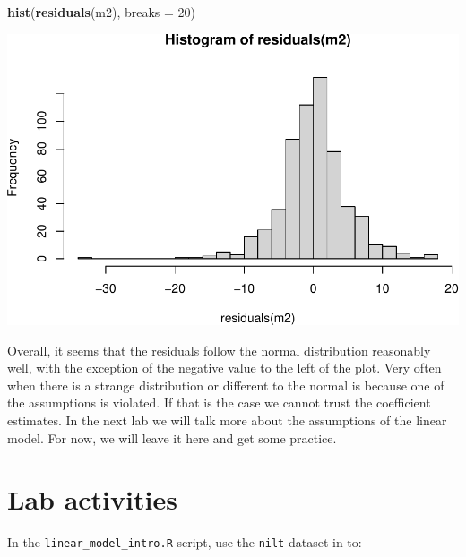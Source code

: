 \documentclass[
]{book}
\newenvironment{Shaded}{\begin{snugshade}}{\end{snugshade}}
\newcommand{\AttributeTok}[1]{\textcolor[rgb]{0.13,0.29,0.53}{#1}}
\newcommand{\DecValTok}[1]{\textcolor[rgb]{0.00,0.00,0.81}{#1}}
\newcommand{\FunctionTok}[1]{\textcolor[rgb]{0.13,0.29,0.53}{\textbf{#1}}}
\newcommand{\NormalTok}[1]{#1}
\begin{document}
\begin{Shaded}
\begin{Highlighting}[]
\FunctionTok{hist}\NormalTok{(}\FunctionTok{residuals}\NormalTok{(m2), }\AttributeTok{breaks =} \DecValTok{20}\NormalTok{)}
\end{Highlighting}
\end{Shaded}

\begin{flushleft}\includegraphics[width=1\linewidth]{lab-workbook_files/figure-latex/unnamed-chunk-98-1} \end{flushleft}

Overall, it seems that the residuals follow the normal distribution reasonably well, with the exception of the negative value to the left of the plot. Very often when there is a strange distribution or different to the normal is because one of the assumptions is violated. If that is the case we cannot trust the coefficient estimates. In the next lab we will talk more about the assumptions of the linear model. For now, we will leave it here and get some practice.

\hypertarget{lab-activities}{%
\section{Lab activities}\label{lab-activities}}

In the \texttt{linear\_model\_intro.R} script, use the \texttt{nilt} dataset in to:
\end{document}
